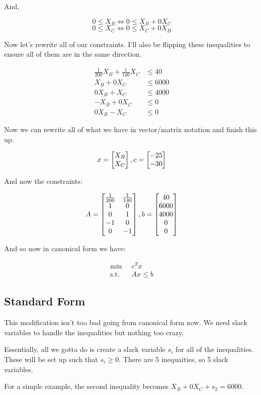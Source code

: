 And, 

\[0 \leq X_B \iff 0 \leq X_B + 0X_C\]
\[0 \leq X_C \iff 0 \leq X_C + 0X_B\]

Now let's rewrite all of our constraints. I'll also be flipping these inequalities to ensure all of them are in the same direction.

\begin{align*}
	\frac{1}{200} X_B + \frac{1}{140}X_C &\leq 40 \\
	X_B + 0X_C &\leq 6000 \\
	0X_B + X_C &\leq 4000 \\
	-X_B + 0X_C &\leq 0 \\
	0X_B - X_C &\leq 0
\end{align*}

Now we can rewrite all of what we have in vector/matrix notation and finish this up.

\[
	x = \m{b}{X_B \\ X_C}, c = \m{b}{-25 \\ -30}
\]

And now the constraints:

\[
	A = \m{b}{\frac{1}{200} & \frac{1}{140} \\ 1 & 0 \\ 0 & 1 \\ -1 & 0 \\ 0 & -1}, b = \m{b}{40 \\ 6000 \\ 4000 \\ 0 \\ 0}
\]

And so now in canonical form we have:


\begin{align*}
	\min \;\; & c^T x \\
	\text{s.t.} \;\; & Ax \leq b
\end{align*}

\subsection*{Standard Form}

This modification isn't too bad going from canonical form now. We need slack variables to handle the inequalities but nothing too crazy.

Essentially, all we gotta do is create a slack variable $s_i$ for all of the inequalities. These will be set up such that $s_i \geq 0$. There are 5 inequaities, so 5 slack variables. 

For a simple example, the second inequality becomes $X_B + 0X_C + s_2 = 6000$. 

